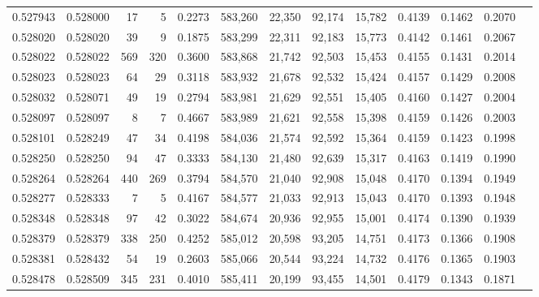 \begin{tabular}{rrrrrrrrrrrrr}
0.527943 & 0.528000 &    17 &     5 &                                     0.2273 & 583,260 &  22,350 &  92,174 &  15,782 & 0.4139 & 0.1462 & 0.2070 \\
0.528020 & 0.528020 &    39 &     9 &                                     0.1875 & 583,299 &  22,311 &  92,183 &  15,773 & 0.4142 & 0.1461 & 0.2067 \\
0.528022 & 0.528022 &   569 &   320 &                                     0.3600 & 583,868 &  21,742 &  92,503 &  15,453 & 0.4155 & 0.1431 & 0.2014 \\
0.528023 & 0.528023 &    64 &    29 &                                     0.3118 & 583,932 &  21,678 &  92,532 &  15,424 & 0.4157 & 0.1429 & 0.2008 \\
0.528032 & 0.528071 &    49 &    19 &                                     0.2794 & 583,981 &  21,629 &  92,551 &  15,405 & 0.4160 & 0.1427 & 0.2004 \\
0.528097 & 0.528097 &     8 &     7 &                                     0.4667 & 583,989 &  21,621 &  92,558 &  15,398 & 0.4159 & 0.1426 & 0.2003 \\
0.528101 & 0.528249 &    47 &    34 &                                     0.4198 & 584,036 &  21,574 &  92,592 &  15,364 & 0.4159 & 0.1423 & 0.1998 \\
0.528250 & 0.528250 &    94 &    47 &                                     0.3333 & 584,130 &  21,480 &  92,639 &  15,317 & 0.4163 & 0.1419 & 0.1990 \\
0.528264 & 0.528264 &   440 &   269 &                                     0.3794 & 584,570 &  21,040 &  92,908 &  15,048 & 0.4170 & 0.1394 & 0.1949 \\
0.528277 & 0.528333 &     7 &     5 &                                     0.4167 & 584,577 &  21,033 &  92,913 &  15,043 & 0.4170 & 0.1393 & 0.1948 \\
0.528348 & 0.528348 &    97 &    42 &                                     0.3022 & 584,674 &  20,936 &  92,955 &  15,001 & 0.4174 & 0.1390 & 0.1939 \\
0.528379 & 0.528379 &   338 &   250 &                                     0.4252 & 585,012 &  20,598 &  93,205 &  14,751 & 0.4173 & 0.1366 & 0.1908 \\
0.528381 & 0.528432 &    54 &    19 &                                     0.2603 & 585,066 &  20,544 &  93,224 &  14,732 & 0.4176 & 0.1365 & 0.1903 \\
0.528478 & 0.528509 &   345 &   231 &                                     0.4010 & 585,411 &  20,199 &  93,455 &  14,501 & 0.4179 & 0.1343 & 0.1871 \\

\end{tabular}
